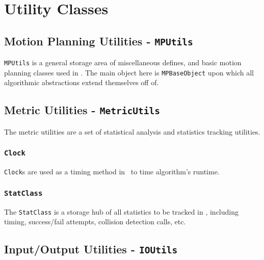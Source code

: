 \chapter{Utility Classes}

\section{Motion Planning Utilities - \texttt{MPUtils}}

\texttt{MPUtils} is a general storage area of miscellaneous defines, and basic
motion planning classes used in \pmpl. The main object here is
\texttt{MPBaseObject} upon which all algorithmic abstractions extend themselves
off of.

\section{Metric Utilities - \texttt{MetricUtils}}

The metric utilities are a set of statistical analysis and statistics tracking
utilities.

\subsection{\texttt{Clock}}

\texttt{Clock}s are used as a timing method in \pmpl\ to time algorithm's
runtime.

\subsection{\texttt{StatClass}}

The \texttt{StatClass} is a storage hub of all statistics to be tracked in
\pmpl, including timing, success/fail attempts, collision detection calls, etc.

\section{Input/Output Utilities - \texttt{IOUtils}}

